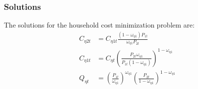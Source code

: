 \documentclass[../thesis.tex]{subfiles}
\begin{document}
\begin{comment}
	Substitute \ref{eq_v2:reg-C-eta-12-t} in \ref{eq_v2:reg-consumption-aggregation}:
	\begin{align}
		C_{\eta t} &= C_{\eta 1 t}^{\omega_{\eta 1}} \left[ C_{\eta 1 t} \frac{(1 - \omega_{\eta 1}) P_{1t}}{\omega_{\eta 1} P_{2t}} \right]^{1-\omega_{\eta 1}} \implies \nonumber \\
		C_{\eta 1 t} &= C_{\eta t} \left( \frac{P_{2t} \omega_{\eta 1}}{P_{1t} (1 - \omega_{\eta 1})} \right)^{1-\omega_{\eta 1}} %
	\end{align}

	Substitute \ref{eq_v2:reg-C-eta1t} and \ref{eq_v2:reg-C-eta2t} in \ref{eq_v2:reg-consumption-aggregation}:
	\begin{align}
		C_{\eta t} &= \left( \frac{\omega_{\eta 1} Q_{\eta t} C_{\eta t}}{P_{1t}} \right)^{\omega_{\eta 1}} \left( \frac{(1 - \omega_{\eta 1}) Q_{\eta t} C_{\eta t}}{P_{2t}} \right)^{1-\omega_{\eta 1}} \implies \nonumber \\
		Q_{\eta t} &= \left( \frac{P_{1 t}}{\omega_{\eta 1}} \right)^{\omega_{\eta 1}} \left( \frac{P_{2 t}}{1 -\omega_{\eta 1}} \right)^{1 -\omega_{\eta 1}} %
	\end{align}

\end{comment}

\subsubsection*{Solutions}
The solutions for the household cost minimization problem are:
\begin{align}
	C_{\eta 2 t} &= C_{\eta 1 t} \frac{(1 - \omega_{\eta 1}) P_{1t}}{\omega_{\eta 1} P_{2t}} \label{eq_v2:reg-C-eta-12-t} \\
	C_{\eta 1 t} &= C_{\eta t} \left( \frac{P_{2t} \omega_{\eta 1}}{P_{1t} (1 - \omega_{\eta 1})} \right)^{1-\omega_{\eta 1}} \label{eq_v2:reg-C-eta-1-t} \\
	Q_{\eta t} &= \left( \frac{P_{1 t}}{\omega_{\eta 1}} \right)^{\omega_{\eta 1}} \left( \frac{P_{2 t}}{1 -\omega_{\eta 1}} \right)^{1 -\omega_{\eta 1}} \label{eq_v2:reg-total-expense-level}
\end{align}

\begin{comment}
	
		Divide \ref{eq_v2:reg-total-expense-level} of region 1 by region 2:
	\begin{align}
		\frac{Q_{1t}}{Q_{2t}} &= \frac{\left( \frac{P_{1 t}}{\omega_{11}} \right)^{\omega_{11}} \left( \frac{P_{2 t}}{1 -\omega_{11}} \right)^{1 -\omega_{11}}}{\left( \frac{P_{1 t}}{\omega_{21}} \right)^{\omega_{21}} \left( \frac{P_{2 t}}{1 -\omega_{21}} \right)^{1 -\omega_{21}}} \implies \nonumber \\
		\frac{Q_{1t}}{Q_{2t}} &= \frac{\omega_{21}^{\omega_{21}} (1 -\omega_{21})^{1 -\omega_{21}}}{\omega_{11}^{\omega_{11}} (1 - \omega_{11})^{1 - \omega_{11}}} \label{eq_v2:reg-total-expense-level-2}
	\end{align}
	
\end{comment}
\end{document}

